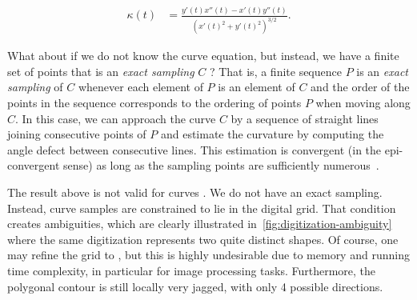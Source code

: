 \documentclass[review]{siamart220329}
\begin{document}
\begin{align*}
\kappa (t) &= \frac{y'(t)x''(t) -x'(t)y''(t)}{(x'(t)^2 + y'(t)^2)^{3/2}}.
\end{align*}

What about if we do not know the curve equation, but instead, we have a finite set of points that is an \emph{exact sampling} $C$ ? That is, a finite sequence $P$ is an {\em exact sampling} of $C$ whenever each element of $P$ is an element of $C$ and the order of the points in the sequence corresponds to the ordering of points $P$ when moving along $C$. In this case, we can approach the curve $C$ by a sequence of straight lines joining consecutive points of $P$ and estimate the curvature by computing the angle defect between consecutive lines. This estimation is convergent (in the epi-convergent sense) as long as the sampling points are sufficiently numerous~\cite{bruckstein01discrete,bruckstein01convergence}.

The result above is not valid for curves . We do not have an exact sampling. Instead, curve samples are constrained to lie in the digital grid. That condition creates ambiguities, which are clearly illustrated in~\cref{fig:digitization-ambiguity} where the same digitization represents two quite distinct shapes. Of course, one may refine the grid to , but this is highly undesirable due to memory and running time complexity, in particular for image processing tasks. Furthermore, the polygonal contour is still locally very jagged, with only 4 possible directions. 
\end{document}
